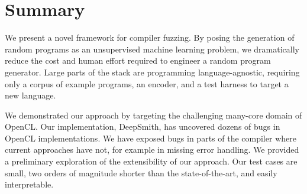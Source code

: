 \section{Summary}%
\label{sec:conclusion}

We present a novel framework for compiler fuzzing. By posing the generation of
random programs as an unsupervised machine learning problem, we dramatically
reduce the cost and human effort required to engineer a random program
generator. Large parts of the stack are programming language-agnostic, requiring
only a corpus of example programs, an encoder, and a test harness to target a
new language.

We demonstrated our approach by targeting the challenging many-core domain of
OpenCL. Our implementation, DeepSmith, has uncovered dozens of bugs in OpenCL
implementations. We have exposed bugs in parts of the compiler where current
approaches have not, for example in missing error handling. We provided a
preliminary exploration of the extensibility of our approach. Our test cases are
small, two orders of magnitude shorter than the state-of-the-art, and easily
interpretable.

